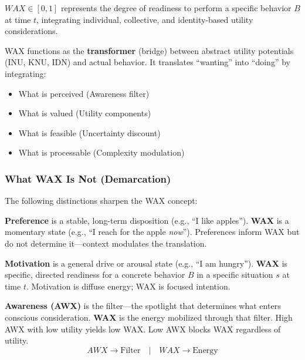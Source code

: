 \begin{definition}
\label{def:wax}
$WAX \in [0,1]$ represents the degree of readiness to perform a specific behavior $B$ at time $t$, integrating individual, collective, and identity-based utility considerations.
\end{definition}


\begin{definition}
\label{def:wax-transformer}
WAX functions as the \textbf{transformer} (bridge) between abstract utility potentials (INU, KNU, IDN) and actual behavior. It translates ``wanting'' into ``doing'' by integrating:
\begin{itemize}
\item What is perceived (Awareness filter)
\item What is valued (Utility components)
\item What is feasible (Uncertainty discount)
\item What is processable (Complexity modulation)
\end{itemize}
\end{definition}

\subsubsection*{What WAX Is Not (Demarcation)}

The following distinctions sharpen the WAX concept:

\begin{definition}
\label{def:wax-not-preference}
\textbf{Preference} is a stable, long-term disposition (e.g., ``I like apples''). 
\textbf{WAX} is a momentary state (e.g., ``I reach for the apple \textit{now}'').
Preferences inform WAX but do not determine it---context modulates the translation.
\end{definition}

\begin{definition}
\label{def:wax-not-motivation}
\textbf{Motivation} is a general drive or arousal state (e.g., ``I am hungry'').
\textbf{WAX} is specific, directed readiness for a concrete behavior $B$ in a specific situation $s$ at time $t$.
Motivation is diffuse energy; WAX is focused intention.
\end{definition}

\begin{definition}
\label{def:wax-not-awareness}
\textbf{Awareness (AWX)} is the filter---the spotlight that determines what enters conscious consideration.
\textbf{WAX} is the energy mobilized through that filter.
High AWX with low utility yields low WAX. Low AWX blocks WAX regardless of utility.
\[AWX \rightarrow \text{Filter} \quad | \quad WAX \rightarrow \text{Energy}\]
\end{definition}

